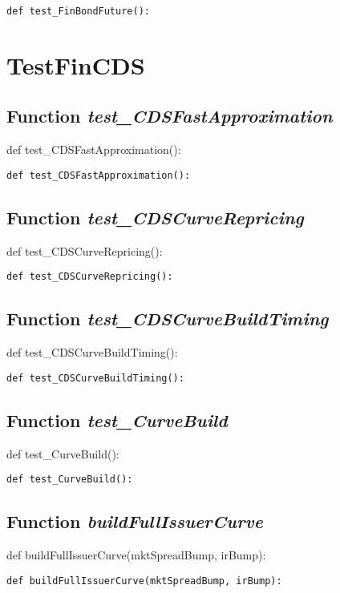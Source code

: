 \documentclass[twoside,11pt]{book}
\begin{document}
\begin{lstlisting}
def test_FinBondFuture():
\end{lstlisting}


\newpage
\section{TestFinCDS}

\subsection{Function {\it test\_CDSFastApproximation}}
def test\_CDSFastApproximation():

\begin{lstlisting}
def test_CDSFastApproximation():
\end{lstlisting}

\subsection{Function {\it test\_CDSCurveRepricing}}
def test\_CDSCurveRepricing():

\begin{lstlisting}
def test_CDSCurveRepricing():
\end{lstlisting}

\subsection{Function {\it test\_CDSCurveBuildTiming}}
def test\_CDSCurveBuildTiming():

\begin{lstlisting}
def test_CDSCurveBuildTiming():
\end{lstlisting}

\subsection{Function {\it test\_CurveBuild}}
def test\_CurveBuild():

\begin{lstlisting}
def test_CurveBuild():
\end{lstlisting}

\subsection{Function {\it buildFullIssuerCurve}}
def buildFullIssuerCurve(mktSpreadBump, irBump):

\begin{lstlisting}
def buildFullIssuerCurve(mktSpreadBump, irBump):
\end{lstlisting}
\end{document}
